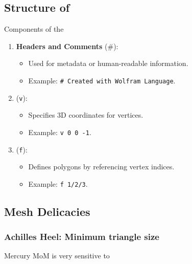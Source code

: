 \subsection{Structure of \facet}
\begin{frame}{Components of the \obj}
    \begin{enumerate}
        \item \textbf{Headers and Comments} (\#):
            \begin{itemize}
                \item Used for metadata or human-readable information.
                \item Example: \texttt{\# Created with Wolfram Language}.
            \end{itemize}

        \item {} (\texttt{v}):
            \begin{itemize}
                \item Specifies 3D coordinates for vertices.
                \item Example: \texttt{v 0 0 -1}.
            \end{itemize}

        \item {} (\texttt{f}):
            \begin{itemize}
                \item Defines polygons by referencing vertex indices.
                \item Example: \texttt{f 1/2/3}.
            \end{itemize}
    \end{enumerate}
        \setcounter{listnumber}{\value{enumi}}
\end{frame}

\subsection{Mesh Delicacies}

\begin{frame}
	\frametitle{Achilles Heel: Minimum triangle size}
	Mercury MoM is very sensitive to \color{red}{Spectral radius}
\end{frame}

\newcommand{\passed}[0]		{\begin{center}{
\tiny{\texttt{\dg{--------------------------------------------------------------------------------}}} \\
\tiny{\texttt{\dg{\phantom{----}---| Mercury MOM Completed }\bl{Sucessfully}\dg{ |---}}} \\
\tiny{\texttt{\dg{--------------------------------------------------------------------------------}}}}
\end{center}}

